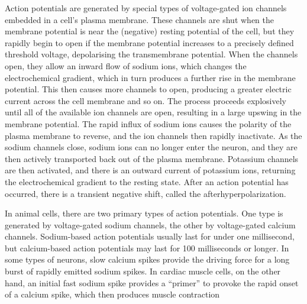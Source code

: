 Action potentials are generated by special types of voltage-gated ion channels embedded in a cell's plasma membrane. These channels are shut when the membrane potential is near the (negative) resting potential of the cell, but they rapidly begin to open if the membrane potential increases to a precisely defined threshold voltage, depolarising the transmembrane potential. When the channels open, they allow an inward flow of sodium ions, which changes the electrochemical gradient, which in turn produces a further rise in the membrane potential. This then causes more channels to open, producing a greater electric current across the cell membrane and so on. The process proceeds explosively until all of the available ion channels are open, resulting in a large upswing in the membrane potential. The rapid influx of sodium ions causes the polarity of the plasma membrane to reverse, and the ion channels then rapidly inactivate. As the sodium channels close, sodium ions can no longer enter the neuron, and they are then actively transported back out of the plasma membrane. Potassium channels are then activated, and there is an outward current of potassium ions, returning the electrochemical gradient to the resting state. After an action potential has occurred, there is a transient negative shift, called the afterhyperpolarization.

In animal cells, there are two primary types of action potentials. One type is generated by voltage-gated sodium channels, the other by voltage-gated calcium channels. Sodium-based action potentials usually last for under one millisecond, but calcium-based action potentials may last for 100 milliseconds or longer. In some types of neurons, slow calcium spikes provide the driving force for a long burst of rapidly emitted sodium spikes. In cardiac muscle cells, on the other hand, an initial fast sodium spike provides a ``primer'' to provoke the rapid onset of a calcium spike, which then produces muscle contraction



